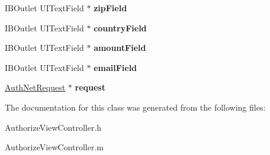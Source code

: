 \begin{DoxyCompactItemize}
\item 
\hypertarget{interface_authorize_view_controller_afe1d8fbc9a38eaebb0d5ecde4a43bf15}{
IBOutlet UITextField $\ast$ {\bfseries zipField}}
\label{interface_authorize_view_controller_afe1d8fbc9a38eaebb0d5ecde4a43bf15}

\item 
\hypertarget{interface_authorize_view_controller_a6c2f658f2a3e6adc0e12aed1c10314d4}{
IBOutlet UITextField $\ast$ {\bfseries countryField}}
\label{interface_authorize_view_controller_a6c2f658f2a3e6adc0e12aed1c10314d4}

\item 
\hypertarget{interface_authorize_view_controller_a13143e047c5dfee301a9c14c44d0d42d}{
IBOutlet UITextField $\ast$ {\bfseries amountField}}
\label{interface_authorize_view_controller_a13143e047c5dfee301a9c14c44d0d42d}

\item 
\hypertarget{interface_authorize_view_controller_a08fdc978b03854d1d74c87f0f9e974f9}{
IBOutlet UITextField $\ast$ {\bfseries emailField}}
\label{interface_authorize_view_controller_a08fdc978b03854d1d74c87f0f9e974f9}

\item 
\hypertarget{interface_authorize_view_controller_a2a04d062b6fba2e048ced23e8ad01a87}{
\hyperlink{interface_auth_net_request}{AuthNetRequest} $\ast$ {\bfseries request}}
\label{interface_authorize_view_controller_a2a04d062b6fba2e048ced23e8ad01a87}

\end{DoxyCompactItemize}


The documentation for this class was generated from the following files:\begin{DoxyCompactItemize}
\item 
AuthorizeViewController.h\item 
AuthorizeViewController.m\end{DoxyCompactItemize}

